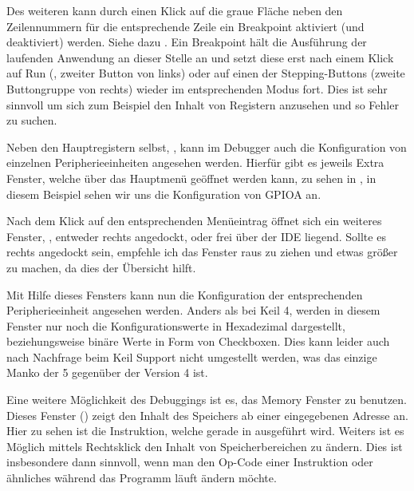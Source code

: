 Des weiteren kann durch einen Klick auf die graue Fläche neben den Zeilennummern für die entsprechende Zeile ein Breakpoint aktiviert (und deaktiviert) werden. Siehe dazu . Ein Breakpoint hält die Ausführung der laufenden Anwendung an dieser Stelle an und setzt diese erst nach einem Klick auf Run (, zweiter Button von links) oder auf einen der Stepping-Buttons (zweite Buttongruppe von rechts) wieder im entsprechenden Modus fort. Dies ist sehr sinnvoll um sich zum Beispiel den Inhalt von Registern anzusehen und so Fehler zu suchen.


Neben den Hauptregistern selbst, , kann im Debugger auch die Konfiguration von einzelnen Peripherieeinheiten angesehen werden. Hierfür gibt es jeweils Extra Fenster, welche über das Hauptmenü geöffnet werden kann, zu sehen in , in diesem Beispiel sehen wir uns die Konfiguration von GPIOA an.


Nach dem Klick auf den entsprechenden Menüeintrag öffnet sich ein weiteres Fenster, , entweder rechts angedockt, oder frei über der IDE liegend. Sollte es rechts angedockt sein, empfehle ich das Fenster raus zu ziehen und etwas größer zu machen, da dies der Übersicht hilft.


Mit Hilfe dieses Fensters kann nun die Konfiguration der entsprechenden Peripherieeinheit angesehen werden. Anders als bei \gls{Keil} \uVision{} 4, werden in diesem Fenster nur noch die Konfigurationswerte in Hexadezimal dargestellt, beziehungsweise binäre Werte in Form von Checkboxen. Dies kann leider auch nach Nachfrage beim \gls{Keil} Support nicht umgestellt werden, was das einzige Manko der \uVision{} 5 gegenüber der Version 4 ist.


Eine weitere Möglichkeit des Debuggings ist es, das Memory Fenster zu benutzen. Dieses Fenster () zeigt den Inhalt des Speichers ab einer eingegebenen Adresse an. Hier zu sehen ist die Instruktion, welche gerade in  ausgeführt wird. Weiters ist es Möglich mittels Rechtsklick den Inhalt von Speicherbereichen zu ändern. Dies ist insbesondere dann sinnvoll, wenn man den Op-Code einer Instruktion oder ähnliches während das Programm läuft ändern möchte.

